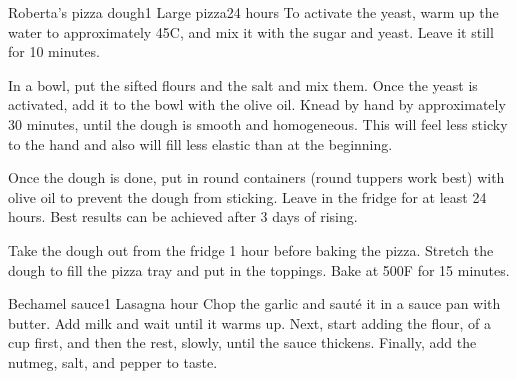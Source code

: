 \documentclass{article}
\begin{document}
\begin{recipe}{Roberta's pizza dough}{1 Large pizza}{24 hours}
  To activate the yeast, warm up the water to approximately 45\degrees{}C, and
  mix it with the sugar and yeast. Leave it still for 10 minutes.

  In a bowl, put the sifted flours and the salt and mix them. Once the yeast is
  activated, add it to the bowl with the olive oil. Knead by hand by
  approximately 30 minutes, until the dough is smooth and homogeneous. This will
  feel less sticky to the hand and also will fill less elastic than at the beginning.

  \freeform
  Once the dough is done, put in round containers (round tuppers work best) with
  olive oil to prevent the dough from sticking. Leave in the fridge for at least
  24 hours. Best results can be achieved after 3 days of rising.

  Take the dough out from the fridge 1 hour before baking the pizza. Stretch the
  dough to fill the pizza tray and put in the toppings. Bake at 500\degress{}F
  for 15 minutes.
  

\end{recipe}

\begin{recipe}{Bechamel sauce}{1 Lasagna}{ hour}
  Chop the garlic and saut\'{e} it in a sauce pan with butter. Add milk and wait
  until it warms up. Next, start adding the flour,  of a cup first, and then the
  rest, slowly, until the sauce thickens. Finally, add the nutmeg, salt, and
  pepper to taste.


\end{recipe}
\end{document}
